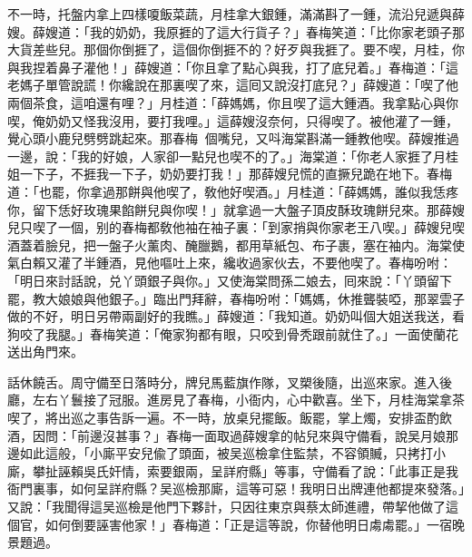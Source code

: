 不一時，托盤内拿上四樣嗄飯菜蔬，月桂拿大銀鍾，滿滿斟了一鍾，流沿兒遞與薛嫂。薛嫂道：「我的奶奶，我原捱的了這大行貨子？」春梅笑道：「比你家老頭子那大貨差些兒。那個你倒捱了，這個你倒捱不的？好歹與我捱了。要不喫，月桂，你與我捏着鼻子灌他！」薛嫂道：「你且拿了點心與我，打了底兒着。」春梅道：「這老媽子單管說謊！你纔說在那裏喫了來，這囘又說沒打底兒？」薛嫂道：「喫了他兩個茶食，這咱還有哩？」月桂道：「薛媽媽，你且喫了這大鍾酒。我拿點心與你喫，俺奶奶又怪我沒用，要打我哩。」這薛嫂沒奈何，只得喫了。被他灌了一鍾，覺心頭小鹿兒劈劈跳起來。那春梅𢫓𢫓個嘴兒，又呌海棠斟滿一鍾教他喫。薛嫂推過一邊，說：「我的好娘，人家卻一點兒也喫不的了。」海棠道：「你老人家捱了月桂姐一下子，不捱我一下子，奶奶要打我！」那薛嫂兒慌的直撅兒跪在地下。春梅道：「也罷，你拿過那餅與他喫了，敎他好喫酒。」月桂道：「薛媽媽，誰似我恁疼你，留下恁好玫瑰果餡餅兒與你喫！」就拿過一大盤子頂皮酥玫瑰餅兒來。那薛嫂兒只喫了一個，别的春梅都敎他袖在袖子裏：「到家捎與你家老王八喫。」薛嫂兒喫酒蓋着臉兒，把一盤子火薰肉、醃臘鵝，都用草紙包、布子裹，塞在袖内。海棠使氣白賴又灌了半鍾酒，見他嘔吐上來，纔收過家伙去，不要他喫了。春梅吩咐：「明日來討話說，兑丫頭銀子與你。」又使海棠問孫二娘去，囘來說：「丫頭留下罷，教大娘娘與他銀子。」臨出門拜辭，春梅吩咐：「媽媽，休推聾裝啞，那翠雲子做的不好，明日另帶兩副好的我瞧。」薛嫂道：「我知道。奶奶叫個大姐送我送，看狗咬了我腿。」春梅笑道：「俺家狗都有眼，只咬到骨秃跟前就住了。」一面使蘭花送出角門來。

話休饒舌。周守備至日落時分，牌兒馬藍旗作隊，叉槊後隨，出巡來家。進入後廳，左右丫鬟接了冠服。進房見了春梅，小衙内，心中歡喜。坐下，月桂海棠拿茶喫了，將出巡之事告訴一遍。不一時，放桌兒擺飯。飯罷，掌上燭，安排盃酌飲酒，因問：「前邊沒甚事？」春梅一面取過薛嫂拿的帖兒來與守備看，說吴月娘那邊如此這般，「小廝平安兒偸了頭面，被吴巡檢拿住監禁，不容領贓，只拷打小廝，攀扯誣賴吳氏奸情，索要銀兩，呈詳府縣」等事，守備看了說：「此事正是我衙門裏事，如何呈詳府縣？吴巡檢那廝，這等可惡！我明日出牌連他都提來發落。」又說：「我聞得這吴巡檢是他門下夥計，只因往東京與蔡太師進禮，帶挈他做了這個官，如何倒要誣害他家！」春梅道：「正是這等說，你替他明日䖏䖏罷。」一宿晚景題過。

